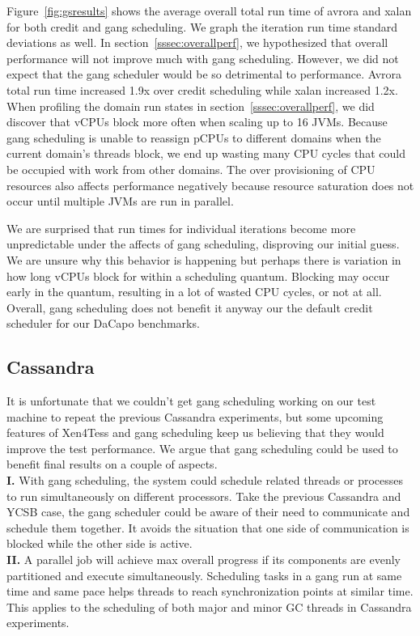 \documentclass{sig-alternate}
\begin{document}
Figure~\ref{fig:gsresults} shows the average overall total run time of avrora and xalan for both credit and gang scheduling. We graph the iteration run time standard deviations as well. In section~\ref{sssec:overallperf}, we hypothesized that overall performance will not improve much with gang scheduling. However, we did not expect that the gang scheduler would be so detrimental to performance. Avrora total run time increased 1.9x over credit scheduling while xalan increased 1.2x. When profiling the domain run states in section~\ref{sssec:overallperf}, we did discover that vCPUs block more often when scaling up to 16 JVMs. Because gang scheduling is unable to reassign pCPUs to different domains when the current domain's threads block, we end up wasting many CPU cycles that could be occupied with work from other domains. The over provisioning of CPU resources also affects performance negatively because resource saturation does not occur until multiple JVMs are run in parallel.

We are surprised that run times for individual iterations become more unpredictable under the affects of gang scheduling, disproving our initial guess. We are unsure why this behavior is happening but perhaps there is variation in how long vCPUs block for within a scheduling quantum. Blocking may occur early in the quantum, resulting in a lot of wasted CPU cycles, or not at all. Overall, gang scheduling does not benefit it anyway our the default credit scheduler for our DaCapo benchmarks.

\subsection{Cassandra} \label{subsec:cassandragang}
It is unfortunate that we couldn't get gang scheduling working on our test machine to repeat the previous Cassandra experiments, but some upcoming features of Xen4Tess and gang scheduling keep us believing that they would improve the test performance. We argue that gang scheduling could be used to benefit final results on a couple of aspects\cite{feitelson1992gang}.
\\\textbf{I.} With gang scheduling, the system could schedule related threads or processes to run simultaneously on different processors. Take the previous Cassandra and YCSB case, the gang scheduler could be aware of their need to communicate and schedule them together. It avoids the situation that one side of communication is blocked while the other side is active.
\\\textbf{II.} A parallel job will achieve max overall progress if its components are evenly partitioned and execute simultaneously. Scheduling tasks in a gang run at same time and same pace helps threads to reach synchronization points at similar time. This applies to the scheduling of both major and minor GC threads in Cassandra experiments.
\end{document}
